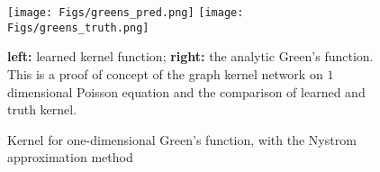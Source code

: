 \begin{figure}[t]
    \centering
    \texttt{[image: Figs/greens\_pred.png]}
    \texttt{[image: Figs/greens\_truth.png]}
        \caption{Kernel for one-dimensional Green's function, with the Nystrom approximation method}
    \label{fig:kernel1d_nystrom}
    \small{
    {\bf left:} learned kernel function; {\bf right:} the analytic Green's function.\\
    This is a proof of concept of the graph kernel network on $1$ dimensional Poisson equation and the comparison
    of learned and truth kernel.
    }
\end{figure}

\iffalse
The Nystr\"om approximation method has an test error rate of $1\mathrm{e}{-7}$ ({\bf shall use relative error}). As shown in Figure \ref{fig:kernel1d_nystrom}, the learned kernel function $\kappa(x,y)$ is very close to the true Green function $G$. It can be seems that the learned kernel is ``shallower'' and ``wider'' compared to the true Green's function ($\kappa(0.5, 0.5) \approx 0.22$, $G(0.5, 0.5)=0.25$). Because the learn kernel has near zero test error, it implies the learned ``shallower'' and ``wider'' is also a near optimal solution for this equation. It can be seems, the neural networks kernel well approximated the true kernel (the Green's function).
\fi



